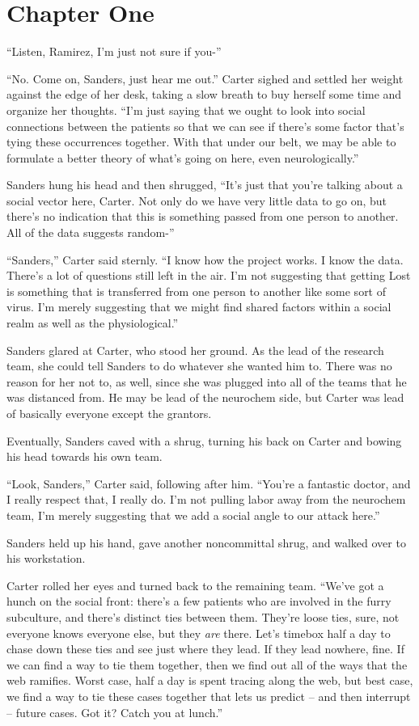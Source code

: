 \chapter*{Chapter One}

``Listen, Ramirez, I'm just not sure if you-''

``No. Come on, Sanders, just hear me out.'' Carter sighed and settled her weight against the edge of her desk, taking a slow breath to buy herself some time and organize her thoughts. ``I'm just saying that we ought to look into social connections between the patients so that we can see if there's some factor that's tying these occurrences together. With that under our belt, we may be able to formulate a better theory of what's going on here, even neurologically.''

Sanders hung his head and then shrugged, ``It's just that you're talking about a social vector here, Carter. Not only do we have very little data to go on, but there's no indication that this is something passed from one person to another. All of the data suggests random-''

``Sanders,'' Carter said sternly. ``I know how the project works. I know the data. There's a lot of questions still left in the air. I'm not suggesting that getting Lost is something that is transferred from one person to another like some sort of virus. I'm merely suggesting that we might find shared factors within a social realm as well as the physiological.''

Sanders glared at Carter, who stood her ground. As the lead of the research team, she could tell Sanders to do whatever she wanted him to. There was no reason for her not to, as well, since she was plugged into all of the teams that he was distanced from. He may be lead of the neurochem side, but Carter was lead of basically everyone except the grantors.

Eventually, Sanders caved with a shrug, turning his back on Carter and bowing his head towards his own team.

``Look, Sanders,'' Carter said, following after him. ``You're a fantastic doctor, and I really respect that, I really do. I'm not pulling labor away from the neurochem team, I'm merely suggesting that we add a social angle to our attack here.''

Sanders held up his hand, gave another noncommittal shrug, and walked over to his workstation.

Carter rolled her eyes and turned back to the remaining team. ``We've got a hunch on the social front: there's a few patients who are involved in the furry subculture, and there's distinct ties between them. They're loose ties, sure, not everyone knows everyone else, but they \textit{are} there. Let's timebox half a day to chase down these ties and see just where they lead. If they lead nowhere, fine. If we can find a way to tie them together, then we find out all of the ways that the web ramifies. Worst case, half a day is spent tracing along the web, but best case, we find a way to tie these cases together that lets us predict -- and then interrupt -- future cases. Got it? Catch you at lunch.''

